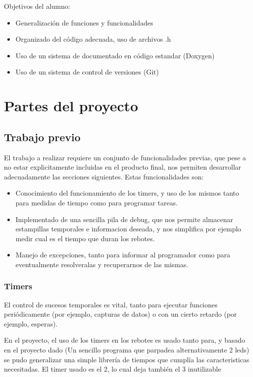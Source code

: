 \documentclass[12pt,letterpaper]{article}
\begin{document}
Objetivos del alumno:
\begin{itemize}
  \item Generalización de funciones y funcionalidades
  \item Organizado del código adecuada, uso de archivos .h
  \item Uso de un sistema de documentado en código estandar (Doxygen)
  \item Uso de un sistema de control de versiones (Git)
\end{itemize}


\section{Partes del proyecto}
\subsection{Trabajo previo}
\label{subsec:previous}
El trabajo a realizar requiere un conjunto de funcionalidades previas,
que pese a no estar explicitamente incluidas en el producto final, nos
permiten desarrollar adecuadamente las secciones siguientes. Estas
funcionalidades son:
\begin{itemize}
  \item Conocimiento del funcionamiento de los timers, y uso de los
    mismos tanto para medidas de tiempo como para programar tareas.
  \item Implementado de una sencilla pila de debug, que nos permite
    almacenar estampillas temporales e informacion deseada, y nos
    simplifica por ejemplo medir cual es el tiempo que duran los
    rebotes.
  \item Manejo de excepciones, tanto para informar al programador como
    para eventualmente resolveralas y recuperarnos de las mismas.
\end{itemize}

\subsubsection{Timers}
\label{subsubsec:timers}
El control de sucesos temporales es vital, tanto para ejecutar
funciones periódicamente (por ejemplo, capturas de datos) o con un
cierto retardo (por ejemplo, esperas).

En el proyecto, el uso de los timers en los rebotes es usado tanto
para, y basado en el proyecto dado (Un sencillo programa que parpadea
alternativamente 2 leds) se pudo generalizar una simple librería de
tiempos que cumplía las caracteristicas necesitadas. El timer usado es
el 2, lo cual deja también el 3 inutilizable
\end{document}

